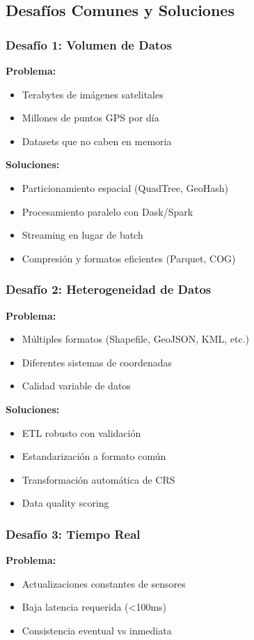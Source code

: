 \documentclass[11pt,a4paper]{article}
\begin{document}
\subsection{Desafíos Comunes y Soluciones}

\subsubsection{Desafío 1: Volumen de Datos}
\textbf{Problema:}
\begin{itemize}
    \item Terabytes de imágenes satelitales
    \item Millones de puntos GPS por día
    \item Datasets que no caben en memoria
\end{itemize}

\textbf{Soluciones:}
\begin{itemize}
    \item Particionamiento espacial (QuadTree, GeoHash)
    \item Procesamiento paralelo con Dask/Spark
    \item Streaming en lugar de batch
    \item Compresión y formatos eficientes (Parquet, COG)
\end{itemize}

\subsubsection{Desafío 2: Heterogeneidad de Datos}
\textbf{Problema:}
\begin{itemize}
    \item Múltiples formatos (Shapefile, GeoJSON, KML, etc.)
    \item Diferentes sistemas de coordenadas
    \item Calidad variable de datos
\end{itemize}

\textbf{Soluciones:}
\begin{itemize}
    \item ETL robusto con validación
    \item Estandarización a formato común
    \item Transformación automática de CRS
    \item Data quality scoring
\end{itemize}

\subsubsection{Desafío 3: Tiempo Real}
\textbf{Problema:}
\begin{itemize}
    \item Actualizaciones constantes de sensores
    \item Baja latencia requerida (<100ms)
    \item Consistencia eventual vs inmediata
\end{itemize}
\end{document}
